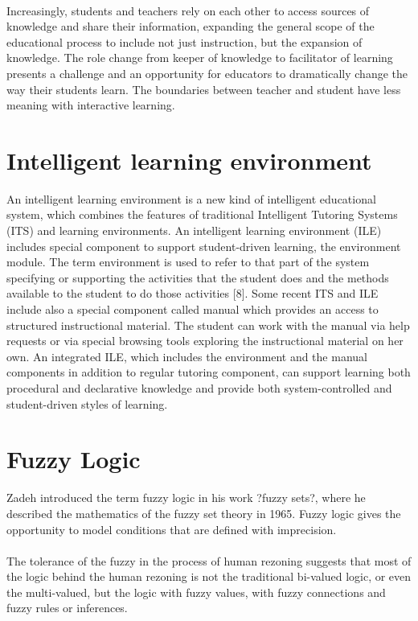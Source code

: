 \documentclass[12pt,letterpaper,oneside] {memoir}
\begin{document}
\paragraph{}
Increasingly, students and teachers rely on each other to access sources of knowledge and share their information, expanding the general scope of the educational process to include not just instruction, but the expansion of knowledge. The role change from keeper of knowledge to facilitator of learning presents a challenge and an opportunity for educators to dramatically change the way their students learn. The boundaries between teacher and student have less meaning with interactive learning.
\section{Intelligent learning environment}
An intelligent learning environment is a new kind of intelligent educational system, which combines the features of traditional Intelligent Tutoring Systems (ITS) and learning environments. An intelligent learning environment (ILE) includes special component to support student-driven learning, the environment module. The term environment is used to refer to that part of the system specifying or supporting the activities that the student does and the methods available to the student to do those activities [8]. Some recent ITS and ILE include also a special component called manual which provides an access to structured instructional material. The student can work with the manual via help requests or via special browsing tools exploring the instructional material on her own. An integrated ILE, which includes the environment and the manual components in addition to regular tutoring component, can support learning both procedural and declarative knowledge and provide both system-controlled and student-driven styles of learning.
\paragraph{}
\section{Fuzzy Logic}
Zadeh introduced the term fuzzy logic in his work ?fuzzy sets?, where he described the mathematics of the fuzzy set theory in 1965.
Fuzzy logic gives the opportunity to model conditions that are defined with imprecision.
\paragraph{}
The tolerance of the fuzzy in the process of human rezoning suggests that most of the logic behind the human rezoning is not the traditional bi-valued logic, or even the multi-valued, but the logic with fuzzy values, with fuzzy connections and fuzzy rules or inferences.
\end{document}
